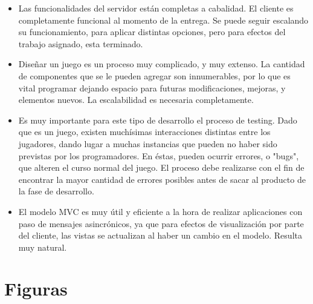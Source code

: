 \documentclass[a4paper,11pt]{article}
\begin{document}
\begin{itemize}
	\item Las funcionalidades del servidor están completas a cabalidad.
	El cliente es completamente funcional al momento de la entrega.
	Se puede seguir escalando su funcionamiento, para aplicar distintas
	opciones, pero para efectos del trabajo asignado, esta terminado.
	\item Diseñar un juego es un proceso muy complicado, y muy extenso.
	La cantidad de componentes que se le pueden agregar son innumerables,
	por lo que es vital programar dejando espacio para futuras 
	modificaciones, mejoras, y elementos nuevos. La escalabilidad es
	necesaria completamente. 
	\item Es muy importante para este tipo de desarrollo el proceso 
	de testing. Dado que es un juego, existen muchísimas interacciones 
	distintas entre los jugadores, dando lugar a muchas instancias que 
	pueden no haber sido previstas por los programadores. En éstas, pueden 
	ocurrir errores, o "bugs", que alteren el curso normal del juego.
	El proceso debe realizarse con el fin de encontrar la mayor cantidad
	de errores posibles antes de sacar al producto de la fase de desarrollo.
 	\item El modelo MVC es muy útil y eficiente a la hora de realizar
	aplicaciones con paso de mensajes asincrónicos, ya que para efectos
	de visualización por parte del cliente, las vistas se actualizan 
	al haber un cambio en el modelo. Resulta muy natural.

\end{itemize}
\newpage 
\appendix
\section{Figuras}
\end{document}
